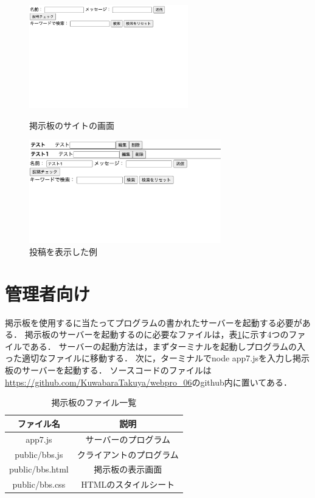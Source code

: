 \documentclass{jsarticle}
\begin{document}
\begin{figure}[h]
    \centering
    \begin{minipage}[b]{0.45\textwidth}
      \centering
      \includegraphics[height=45mm]{fig/ex1.png}
      \caption{掲示板のサイトの画面}
      \label{ex1}
    \end{minipage}
    \begin{minipage}[b]{0.45\textwidth}
      \centering
      \includegraphics[height=45mm]{fig/ex2.png}
      \caption{投稿を表示した例}
      \label{ex2}
    \end{minipage}
\end{figure}

\clearpage
\section*{管理者向け}
掲示板を使用するに当たってプログラムの書かれたサーバーを起動する必要がある．
掲示板のサーバーを起動するのに必要なファイルは，表\ref{file}に示す4つのファイルである．
サーバーの起動方法は，まずターミナルを起動しプログラムの入った適切なファイルに移動する．
次に，ターミナルでnode app7.jsを入力し掲示板のサーバーを起動する．
ソースコードのファイルは\url{https://github.com/KuwabaraTakuya/webpro_06}のgithub内に置いてある．

\begin{table}[ht]\caption{掲示板のファイル一覧}
    \centering
    \begin{tabular}{|c|c|}
       \hline
       ファイル名 &  説明  \\ 
        \hline
        app7.js  & サーバーのプログラム  \\ \hline
        public/bbs.js  & クライアントのプログラム  \\ \hline
        public/bbs.html & 掲示板の表示画面\\ \hline
        public/bbs.css &  HTMLのスタイルシート \\ \hline
    \end{tabular}
    \label{file}
\end{table}
    
\end{document}
